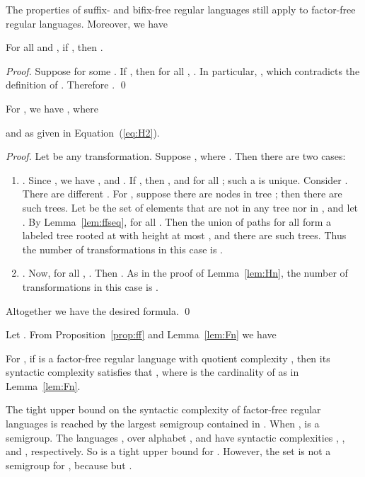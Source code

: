 \documentclass{llncs}
\newcommand{\be}{\begin{enumerate}}
\newcommand{\ee}{\end{enumerate}}
\begin{document}
The properties of suffix- and bifix-free regular languages still apply to factor-free regular languages. Moreover, we have 


\begin{lemma}\label{lem:ffseq} 
For all  and , if , then . 
\end{lemma}

\begin{proof} 
Suppose  for some . If , then for all , . In particular, , which contradicts the definition of . Therefore . \qed
\end{proof}



\begin{lemma}\label{lem:Fn} 
For , we have , where 


and  as given in Equation~(\ref{eq:H2}). 
\end{lemma}

\begin{proof} 
Let  be any transformation. Suppose , where . Then there are two cases: 

\be 
\item . Since , we have , and . If , then , and  for all ; such a  is unique. Consider . There are  different . For , suppose there are  nodes in tree ; then there are  such trees. Let  be the set of elements  that are not in any tree  nor in , and let . By Lemma~\ref{lem:ffseq},  for all . Then the union of paths  for all  form a labeled tree rooted at  with height at most , and there are  such trees. Thus the number of transformations in this case is . 

\item . Now, for all , . Then . As in the proof of Lemma~\ref{lem:Hn}, the number of transformations in this case is . 

\ee

Altogether we have the desired formula. \qed
\end{proof}

Let . From Proposition~\ref{prop:ff} and Lemma~\ref{lem:Fn} we have 
\begin{proposition}\label{prop:Fncard} 
For , if  is a factor-free regular language with quotient complexity , then its syntactic complexity  satisfies that , where  is the cardinality of  as in Lemma~\ref{lem:Fn}.
\end{proposition} 

The tight upper bound on the syntactic complexity of factor-free regular languages is reached by the largest semigroup contained in . When ,  is a semigroup. The languages ,  over alphabet , and  have syntactic complexities , , and , respectively. So  is a tight upper bound for . However, the set  is not a semigroup for , because  but . 
\end{document}
